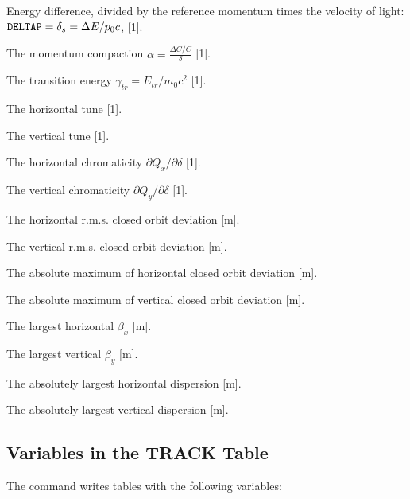 \begin{mylist}
Energy difference,
divided by the reference momentum times the velocity of light:
\(\hbox{\tt DELTAP}=\delta_s =\Delta E/p_{0}c\), [1].

The momentum compaction \(\alpha = \frac{\Delta C /C}{\delta}\) [1].

The transition energy \(\gamma_{tr} = E_{tr} / m_0c^2\) [1].

The horizontal tune [1].

The vertical tune [1].

The horizontal chromaticity \(\partial Q_x / \partial \delta\) [1].

The vertical chromaticity \(\partial Q_y / \partial \delta\) [1].

The horizontal r.m.s. closed orbit deviation [m].

The vertical r.m.s. closed orbit deviation [m].

The absolute maximum of horizontal closed orbit deviation [m].

The absolute maximum of vertical closed orbit deviation [m].

The largest horizontal \(\beta_x\) [m].

The largest vertical \(\beta_y\) [m].

The absolutely largest horizontal dispersion [m].

The absolutely largest vertical dispersion [m].
\end{mylist}
 
\subsection{Variables in the TRACK Table}
\label{S-TRTAB}
The command  writes tables with the following variables:

